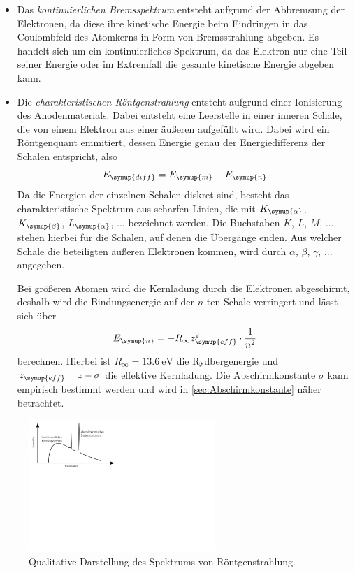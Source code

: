 \begin{itemize}
    \item Das \textit{kontinuierlichen Bremsspektrum} entsteht aufgrund der Abbremsung der Elektronen,
    da diese ihre kinetische Energie beim Eindringen in das Coulombfeld des Atomkerns in Form von Bremsstrahlung
    abgeben. Es handelt sich um ein kontinuierliches Spektrum, da das Elektron nur eine Teil seiner Energie oder
    im Extremfall die gesamte kinetische Energie abgeben kann.

    \item Die \textit{charakteristischen Röntgenstrahlung} entsteht aufgrund einer Ionisierung des Anodenmaterials.
    Dabei entsteht eine Leerstelle in einer inneren Schale, die von einem Elektron aus einer äußeren aufgefüllt wird.
    Dabei wird ein Röntgenquant emmitiert, dessen Energie genau der Energiedifferenz der Schalen entspricht, also
    \begin{equation*}
        E_{\symup{diff}}=E_{\symup{m}}-E_{\symup{n}}
    \end{equation*}
    Da die Energien der einzelnen Schalen diskret sind, besteht das charakteristische Spektrum aus scharfen Linien, die
    mit $K_{\symup{\alpha}}$, $K_{\symup{\beta}}$, $L_{\symup{\alpha}}$, ... bezeichnet werden. Die Buchstaben $K$, $L$, $M$, ...
    stehen hierbei für die Schalen, auf denen die Übergänge enden. Aus welcher Schale die beteiligten äußeren Elektronen
    kommen, wird durch $\alpha$, $\beta$, $\gamma$, ... angegeben.

    Bei größeren Atomen wird die Kernladung durch die Elektronen abgeschirmt, deshalb wird die Bindungsenergie auf der
    $n$-ten Schale verringert und lässt sich über
    \begin{equation*}
        E_{\symup{n}}=-R_{\infty}z_{\symup{eff}}^{2}\cdot\frac{1}{n^2}
    \end{equation*}
    berechnen. Hierbei ist $R_{\infty}=\qty{13.6}{\electronvolt}$ die Rydbergenergie und $z_{\symup{eff}}=z-\sigma$
    die effektive Kernladung.
    Die Abschirmkonstante $\sigma$ kann empirisch bestimmt werden und wird in \autoref{sec:Abschirmkonstante}
    näher betrachtet.  
\end{itemize}

\begin{figure}[H]
    \centering
    \includegraphics[height=5cm]{content/pics/bremsspektrum.pdf}
    \caption{Qualitative Darstellung des Spektrums von Röntgenstrahlung.\cite{Bremsspektrum}}
    \label{fig:Roentgen}
\end{figure}


